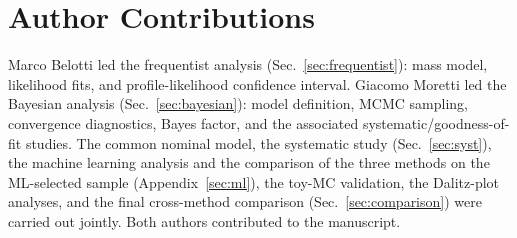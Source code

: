 \section{Author Contributions}
\label{sec:contributions}
Marco Belotti led the frequentist analysis (Sec.~\ref{sec:frequentist}): mass model, likelihood fits, and profile-likelihood confidence interval. Giacomo Moretti led the Bayesian analysis (Sec.~\ref{sec:bayesian}): model definition, MCMC sampling, convergence diagnostics, Bayes factor, and the associated systematic/goodness-of-fit studies. The common nominal model, the systematic study (Sec.~\ref{sec:syst}), the machine learning analysis and the comparison of the three methods on the ML-selected sample (Appendix~\ref{sec:ml}), the toy-MC validation, the Dalitz-plot analyses, and the final cross-method comparison (Sec.~\ref{sec:comparison}) were carried out jointly. Both authors contributed to the manuscript.
